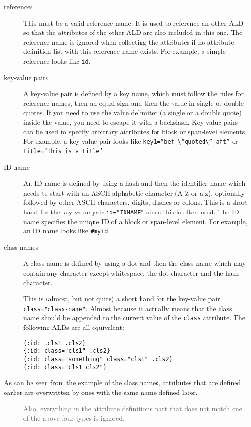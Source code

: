 \documentclass[a4paper]{article}
\begin{document}
\begin{description}
\item[references]
This must be a valid reference name. It is used to reference an other
ALD so that the attributes of the other ALD are also included in this
one. The reference name is ignored when collecting the attributes if no
attribute definition list with this reference name exists. For example,
a simple reference looks like \texttt{id}.
\item[key-value pairs]
A key-value pair is defined by a key name, which must follow the rules
for reference names, then an equal sign and then the value in single or
double quotes. If you need to use the value delimiter (a single or a
double quote) inside the value, you need to escape it with a backslash.
Key-value pairs can be used to specify arbitrary attributes for block or
span-level elements. For example, a key-value pair looks like
\texttt{key1=``bef\ \textbackslash{}``quoted\textbackslash{}''\ aft''} or
\texttt{title=`This\ is\ a\ title'}.
\item[ID name]
An ID name is defined by using a hash and then the identifier name which
needs to start with an ASCII alphabetic character (A-Z or a-z),
optionally followed by other ASCII characters, digits, dashes or colons.
This is a short hand for the key-value pair \texttt{id="IDNAME"} since
this is often used. The ID name specifies the unique ID of a block or
span-level element. For example, an ID name looks like \texttt{\#myid}.
\item[class names]
A class name is defined by using a dot and then the class name which may
contain any character except whitespace, the dot character and the hash
character.

This is (almost, but not quite) a short hand for the key-value pair
\texttt{class="class-name"}. Almost because it actually means that the
class name should be appended to the current value of the \texttt{class}
attribute. The following ALDs are all equivalent:

\begin{verbatim}
{:id: .cls1 .cls2}
{:id: class="cls1" .cls2}
{:id: class="something" class="cls1" .cls2}
{:id: class="cls1 cls2"}
\end{verbatim}
\end{description}

As can be seen from the example of the class names, attributes that are
defined earlier are overwritten by ones with the same name defined
later.

\begin{quote}
Also, everything in the attribute definitions part that does not match
one of the above four types is ignored.
\end{quote}
\end{document}
